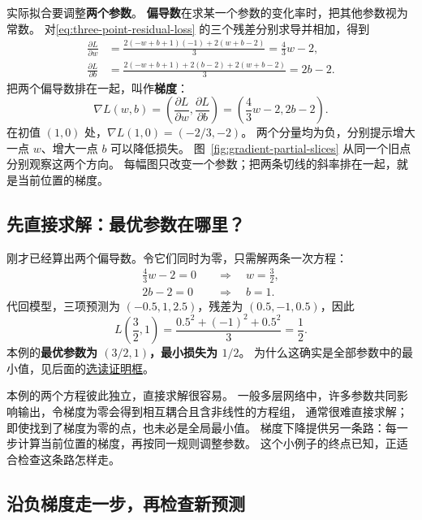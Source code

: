 实际拟合要调整\textbf{两个参数}。
\textbf{偏导数}在求某一个参数的变化率时，把其他参数视为常数。
对\eqref{eq:three-point-residual-loss} 的三个残差分别求导并相加，得到
\[
\begin{aligned}
\frac{\partial L}{\partial w}
&=\frac{2(-w+b+1)(-1)+2(w+b-2)}{3}=\frac43w-2,\\
\frac{\partial L}{\partial b}
&=\frac{2(-w+b+1)+2(b-2)+2(w+b-2)}{3}=2b-2.
\end{aligned}
\]
把两个偏导数排在一起，叫作\textbf{梯度}：
\[
\nabla L(w,b)=\left(\frac{\partial L}{\partial w},\frac{\partial L}{\partial b}\right)
=\left(\frac43w-2,2b-2\right).
\]
在初值 $(1,0)$ 处，$\nabla L(1,0)=\boxed{(-2/3,-2)}$。
两个分量均为负，分别提示增大一点 $w$、增大一点 $b$ 可以降低损失。
图~\ref{fig:gradient-partial-slices} 从同一个旧点分别观察这两个方向。
每幅图只改变一个参数；把两条切线的斜率排在一起，就是当前位置的梯度。


\subsection{先直接求解：最优参数在哪里？}
\label{intro:gradient-direct-solution}

刚才已经算出两个偏导数。令它们同时为零，只需解两条一次方程：
\[
\begin{aligned}
\frac43w-2=0&\quad\Longrightarrow\quad w=\frac32,\\
2b-2=0&\quad\Longrightarrow\quad b=1.
\end{aligned}
\]
代回模型，三项预测为 $(-0.5,1,2.5)$，残差为 $(0.5,-1,0.5)$，因此
\[
L\left(\frac32,1\right)=\frac{0.5^2+(-1)^2+0.5^2}{3}=\boxed{\frac12}.
\]
本例的\textbf{最优参数为 $(3/2,1)$，最小损失为 $1/2$}。
为什么这确实是全部参数中的最小值，见后面的\hyperref[proof:three-point-global-minimum]{选读证明框}。

\begin{boundarybox}[title={能直接解，为什么还要学迭代？}]
本例的两个方程彼此独立，直接求解很容易。
一般多层网络中，许多参数共同影响输出，令梯度为零会得到相互耦合且含非线性的方程组，
通常很难直接求解；即使找到了梯度为零的点，也未必是全局最小值。
梯度下降提供另一条路：每一步计算当前位置的梯度，再按同一规则调整参数。
这个小例子的终点已知，正适合检查这条路怎样走。
\end{boundarybox}

\subsection{沿负梯度走一步，再检查新预测}
\label{concept:gradient-descent}

